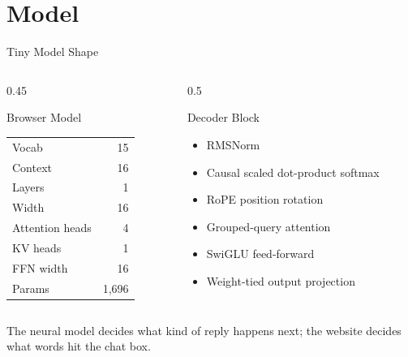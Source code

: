 \documentclass[10pt,aspectratio=169]{beamer}
\begin{document}
\section{Model}

\begin{frame}{Tiny Model Shape}
  \begin{columns}[T]
    \begin{column}{0.45\textwidth}
      \begin{block}{Browser Model}
        \begin{tabular}{lr}
          \toprule
          Vocab & 15 \\
          Context & 16 \\
          Layers & 1 \\
          Width & 16 \\
          Attention heads & 4 \\
          KV heads & 1 \\
          FFN width & 16 \\
          Params & 1,696 \\
          \bottomrule
        \end{tabular}
      \end{block}
    \end{column}
    \begin{column}{0.5\textwidth}
      \begin{block}{Decoder Block}
        \begin{itemize}
          \item RMSNorm
          \item Causal scaled dot-product softmax
          \item RoPE position rotation
          \item Grouped-query attention
          \item SwiGLU feed-forward
          \item Weight-tied output projection
        \end{itemize}
      \end{block}
    \end{column}
  \end{columns}

  \bigskip
  \centering
  The neural model decides \alert{what kind of reply happens next};
  the website decides \alert{what words hit the chat box}.
\end{frame}
\end{document}
